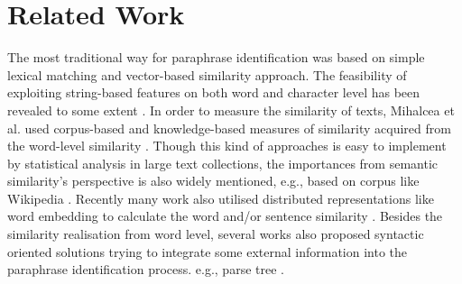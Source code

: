 \documentclass[conference]{IEEEtran}
\begin{document}



\section{Related Work}
The most traditional way for paraphrase identification was based on simple lexical matching and vector-based similarity approach. The feasibility of exploiting string-based features on both word and character level has been revealed to some extent \cite{selfdef:conf/altw/WanDDP06}. In order to measure the similarity of texts, Mihalcea et al. used corpus-based and knowledge-based measures of similarity acquired from the word-level similarity \cite{DBLP:conf/aaai/MihalceaCS06}. Though this kind of approaches is easy to implement by statistical analysis in large text collections, the importances from semantic similarity's perspective is also widely mentioned, e.g., based on corpus like Wikipedia \cite{DBLP:conf/ijcai/GabrilovichM07}. Recently many work also utilised distributed representations like word embedding to calculate the word and/or sentence similarity \cite{DBLP:conf/icml/SantosZ14}. Besides the similarity realisation from word level, several works also proposed syntactic oriented solutions trying to integrate some external information into the paraphrase identification process. e.g., parse tree \cite{DBLP:conf/acl/DasS09}.
\end{document}
